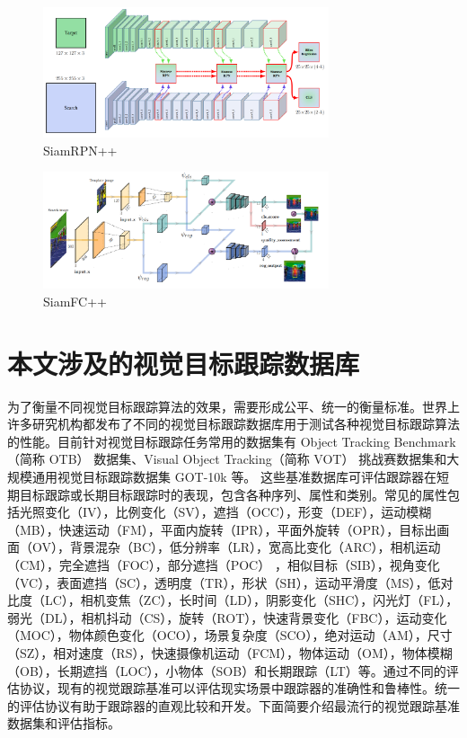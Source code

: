 \begin{figure}
\centering
\includegraphics[width=0.75\textwidth]{Img/related/SiamRPN++.png}
\caption{SiamRPN++}
\end{figure}

\begin{figure}
\centering
\includegraphics[width=0.75\textwidth]{Img/related/SiamFC++.png}
\caption{SiamFC++}
\end{figure}
\fi
\section{本文涉及的视觉目标跟踪数据库}
为了衡量不同视觉目标跟踪算法的效果，需要形成公平、统一的衡量标准。世界上许多研究机构都发布了不同的视觉目标跟踪数据库用于测试各种视觉目标跟踪算法的性能。目前针对视觉目标跟踪任务常用的数据集有 Object Tracking Benchmark（简称 OTB）\cite{OTB} 数据集、Visual Object Tracking（简称 VOT）\cite{VOT2015} 挑战赛数据集和大规模通用视觉目标跟踪数据集 GOT-10k \cite{GOT-10k} 等。
这些基准数据库可评估跟踪器在短期目标跟踪或长期目标跟踪时的表现，包含各种序列、属性和类别。常见的属性包括光照变化（IV），比例变化（SV），遮挡（OCC），形变（DEF），运动模糊（MB），快速运动（FM），平面内旋转（IPR），平面外旋转（OPR），目标出画面（OV），背景混杂（BC），低分辨率（LR），宽高比变化（ARC），相机运动（CM），完全遮挡（FOC），部分遮挡（POC） ，相似目标（SIB），视角变化（VC），表面遮挡（SC），透明度（TR），形状（SH），运动平滑度（MS），低对比度（LC），相机变焦（ZC），长时间（LD），阴影变化（SHC），闪光灯（FL），弱光（DL），相机抖动（CS），旋转（ROT），快速背景变化（FBC），运动变化（MOC），物体颜色变化（OCO），场景复杂度（SCO），绝对运动（AM），尺寸（SZ），相对速度（RS），快速摄像机运动（FCM），物体运动（OM），物体模糊（OB），长期遮挡（LOC），小物体（SOB）和长期跟踪（LT）等。通过不同的评估协议，现有的视觉跟踪基准可以评估现实场景中跟踪器的准确性和鲁棒性。统一的评估协议有助于跟踪器的直观比较和开发。下面简要介绍最流行的视觉跟踪基准数据集和评估指标。
